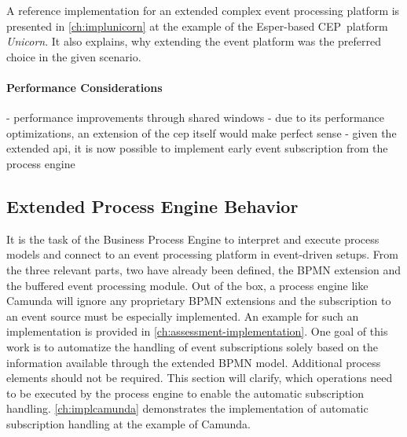 A reference implementation for an extended complex event processing platform is presented in \autoref{ch:implunicorn} at the example of the Esper-based CEP~platform \textit{Unicorn}. It also explains, why extending the event platform was the preferred choice in the given scenario.


\paragraph{Performance Considerations}

- performance improvements through shared windows
- due to its performance optimizations, an extension of the cep itself would make perfect sense
- given the extended api, it is now possible to implement early event subscription from the process engine


\subsection{Extended Process Engine Behavior}\label{ch:extendedprocessengine}
It is the task of the Business Process Engine to interpret and execute process models and connect to an event processing platform in event-driven setups.
From the three relevant parts, two have already been defined, the BPMN extension and the buffered event processing module.
Out of the box, a process engine like Camunda will ignore any proprietary BPMN extensions and the subscription to an event source must be especially implemented. An example for such an implementation is provided in \autoref{ch:assessment-implementation}.
One goal of this work is to automatize the handling of event subscriptions solely based on the information available through the extended BPMN model. Additional process elements should not be required.
This section will clarify, which operations need to be executed by the process engine to enable the automatic subscription handling.
\autoref{ch:implcamunda} demonstrates the implementation of automatic subscription handling at the example of Camunda.


